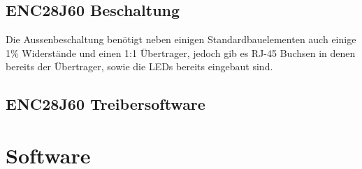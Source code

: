 \documentclass[a4paper,14pt,headsepline]{scrartcl}
\begin{document}
\subsection{ENC28J60 Beschaltung}
Die Aussenbeschaltung benötigt neben einigen Standardbauelementen auch einige 1\% Widerstände und einen 1:1 Übertrager, jedoch gib es RJ-45 Buchsen in denen bereits der Übertrager, sowie die LEDs bereits eingebaut sind.
\begin{figure}[h]
\begin{center}
\end{center}
\end{figure}



\subsection{ENC28J60 Treibersoftware}

\section{Software}

 
\end{document}

